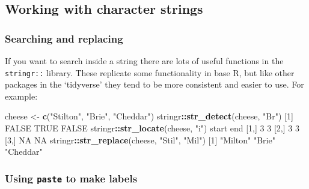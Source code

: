 \documentclass[]{article}
\newenvironment{Shaded}{\begin{snugshade}}{\end{snugshade}}
\newcommand{\DecValTok}[1]{\textcolor[rgb]{0.00,0.00,0.81}{#1}}
\newcommand{\KeywordTok}[1]{\textcolor[rgb]{0.13,0.29,0.53}{\textbf{#1}}}
\newcommand{\NormalTok}[1]{#1}
\newcommand{\OperatorTok}[1]{\textcolor[rgb]{0.81,0.36,0.00}{\textbf{#1}}}
\newcommand{\OtherTok}[1]{\textcolor[rgb]{0.56,0.35,0.01}{#1}}
\newcommand{\StringTok}[1]{\textcolor[rgb]{0.31,0.60,0.02}{#1}}
\begin{document}
\hypertarget{string-handling}{%
\subsection*{Working with character strings}\label{string-handling}}

\hypertarget{searching-and-replacing}{%
\subsubsection{Searching and replacing}\label{searching-and-replacing}}

If you want to search inside a string there are lots of useful functions in the
\texttt{stringr::} library. These replicate some functionality in base R, but like
other packages in the `tidyverse' they tend to be more consistent and easier to
use. For example:

\begin{Shaded}
\begin{Highlighting}[]
\NormalTok{cheese <-}\StringTok{ }\KeywordTok{c}\NormalTok{(}\StringTok{"Stilton"}\NormalTok{, }\StringTok{"Brie"}\NormalTok{, }\StringTok{"Cheddar"}\NormalTok{)}
\NormalTok{stringr}\OperatorTok{::}\KeywordTok{str_detect}\NormalTok{(cheese, }\StringTok{"Br"}\NormalTok{)}
\NormalTok{[}\DecValTok{1}\NormalTok{] }\OtherTok{FALSE}  \OtherTok{TRUE} \OtherTok{FALSE}
\NormalTok{stringr}\OperatorTok{::}\KeywordTok{str_locate}\NormalTok{(cheese, }\StringTok{"i"}\NormalTok{)}
\NormalTok{     start end}
\NormalTok{[}\DecValTok{1}\NormalTok{,]     }\DecValTok{3}   \DecValTok{3}
\NormalTok{[}\DecValTok{2}\NormalTok{,]     }\DecValTok{3}   \DecValTok{3}
\NormalTok{[}\DecValTok{3}\NormalTok{,]    }\OtherTok{NA}  \OtherTok{NA}
\NormalTok{stringr}\OperatorTok{::}\KeywordTok{str_replace}\NormalTok{(cheese, }\StringTok{"Stil"}\NormalTok{, }\StringTok{"Mil"}\NormalTok{)}
\NormalTok{[}\DecValTok{1}\NormalTok{] }\StringTok{"Milton"}  \StringTok{"Brie"}    \StringTok{"Cheddar"}
\end{Highlighting}
\end{Shaded}

\hypertarget{paste}{%
\subsubsection*{\texorpdfstring{Using \texttt{paste} to make labels}{Using paste to make labels}}\label{paste}}
\end{document}

